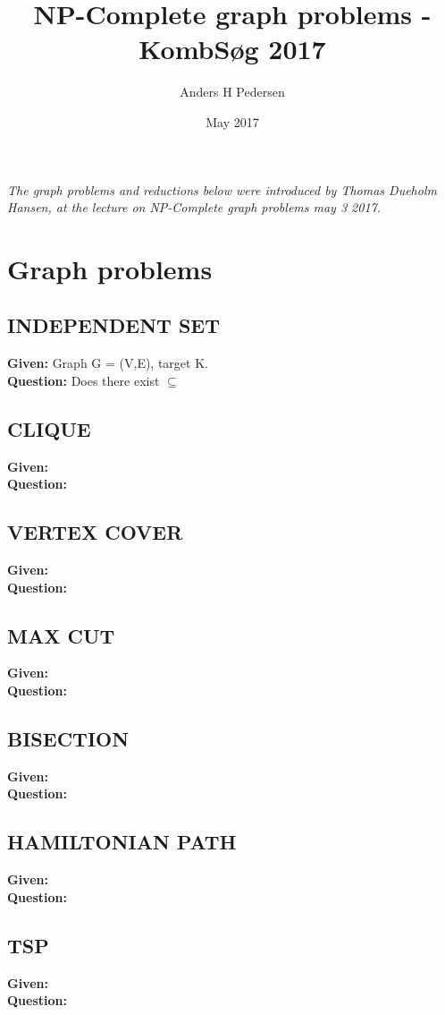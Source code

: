 \documentclass{article}
\title{NP-Complete graph problems - KombSøg 2017}
\author{Anders H Pedersen }
\date{May 2017}
\begin{document}
\maketitle

\begin{center}
\textit{The graph problems and reductions below were introduced by Thomas Dueholm Hansen, at the lecture on NP-Complete graph problems may 3 2017.}
\end{center}

\section{Graph problems}
\subsection{INDEPENDENT SET}
\textbf{Given:} Graph G = (V,E), target K. \\
\textbf{Question:} Does there exist $ \subseteq$ \\
\subsection{CLIQUE}
\textbf{Given:} \\
\textbf{Question:} \\
\subsection{VERTEX COVER}
\textbf{Given:} \\
\textbf{Question:} \\
\subsection{MAX CUT}
\textbf{Given:} \\
\textbf{Question:} \\
\subsection{BISECTION}
\textbf{Given:} \\
\textbf{Question:} \\
\subsection{HAMILTONIAN PATH}
\textbf{Given:} \\
\textbf{Question:} \\
\subsection{TSP}
\textbf{Given:} \\
\textbf{Question:} \\
\end{document}

